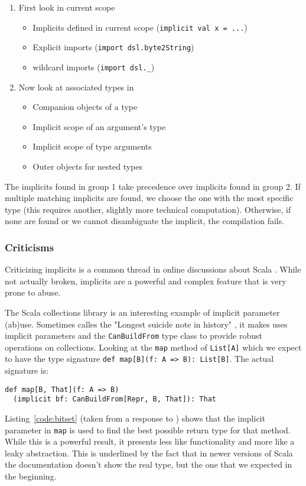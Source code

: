 \begin{enumerate}
	\item First look in current scope
	\begin{itemize}
		\item Implicits defined in current scope (\texttt{implicit val x = ...})
    \item Explicit imports (\texttt{import dsl.byte2String})
    \item wildcard imports (\texttt{import dsl.\_})
	\end{itemize}
	\item Now look at associated types in
	\begin{itemize}
		\item Companion objects of a type
		\item Implicit scope of an argument’s type
		\item Implicit scope of type arguments
		\item Outer objects for nested types
	\end{itemize}
\end{enumerate}

The implicits found in group 1 take precedence over implicits found in group 2. If multiple matching implicits are found, we choose the one with the most specific type (this requires another, slightly more technical computation). Otherwise, if none are found or we cannot disambiguate the implicit, the compilation fails.

\subsubsection{Criticisms}

Criticizing implicits is a common thread in online discussions about Scala \autocite{Plush:2015, lakes:2009, Allan:2013, Hale:2011}. While not actually broken, implicits are a powerful and complex feature that is very prone to abuse.

The Scala collections library is an interesting example of implicit parameter (ab)use. Sometimes calles the "Longest suicide note in history" \autocite{lakes:2009}, it makes uses implicit parameters and the \texttt{CanBuildFrom} type class to provide robust operations on collections. Looking at the \texttt{map} method of \texttt{List[A]} which we expect to have the type signature \texttt{def map[B](f: A => B): List[B]}. The actual signature is:
\begin{verbatim}
def map[B, That](f: A => B)
  (implicit bf: CanBuildFrom[Repr, B, That]): That
\end{verbatim}
Listing~\ref{code:bitset} (taken from a response to \autocite{lakes:2009}) shows that the implicit parameter in \texttt{map} is used to find the best possible return type for that method. While this is a powerful result, it presents less like functionality and more like a leaky abstraction. This is underlined by the fact that in newer versions of Scala the documentation doesn't show the real type, but the one that we expected in the beginning.

